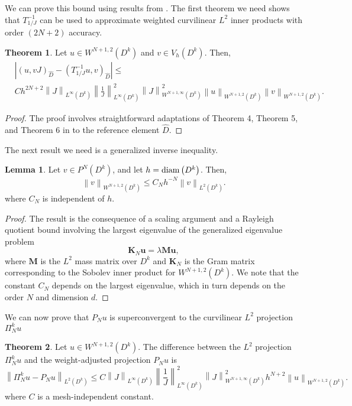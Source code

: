 \documentclass[preprint,10pt]{article}
\theoremstyle{definition}
\theoremstyle{lemma}
\newtheorem{lemma}{Lemma}
\theoremstyle{theorem}
\newtheorem{theorem}{Theorem}
\theoremstyle{assumption}
\renewcommand{\hat}{\widehat}
\newcommand{\nor}[1]{\left\| #1 \right\|}
\newcommand{\LRp}[1]{\left( #1 \right)}
\newcommand{\LRb}[1]{\left| #1 \right|}
\begin{document}
{We can prove this bound using results from \cite{chan2016weight1,chan2016weight2}.  The first theorem we need shows that $T_{1/J}^{-1}$ can be used to approximate weighted curvilinear $L^2$ inner products with order $(2N+2)$ accuracy.  
\begin{theorem}
\label{thm:moment}
Let $u\in W^{N+1,2}\LRp{D^k}$ and $v\in V_h\LRp{D^k}$.  Then, 
\begin{align*}
&\LRb{\LRp{u,vJ}_{\hat{D}} - \LRp{T^{-1}_{1/J}u,v}_{\hat{D}}} \leq \\
&Ch^{2N+2}\nor{J}_{L^{\infty}\LRp{D^k}}  \nor{\frac{1}{J}}_{L^{\infty}\LRp{D^k}}^2 \nor{J}^2_{W^{N+1,\infty}\LRp{D^k}}\nor{u}_{W^{N+1,2}\LRp{D^k}}\nor{v}_{W^{N+1,2}\LRp{D^k}}.
\end{align*}
\end{theorem}
\begin{proof}
The proof involves straightforward adaptations of Theorem 4, Theorem 5, and Theorem 6 in \cite{chan2016weight1} to the reference element $\hat{D}$.  
\end{proof}
The next result we need is a generalized inverse inequality.  
\begin{lemma}
\label{lemma:sobolev}
Let $v \in P^N\LRp{D^k}$, and let $h = {\rm diam}\LRp{D^k}$.  Then,
\[
\nor{v}_{W^{N+1,2}\LRp{D^k}} \leq C_{N} h^{-N} \nor{v}_{L^2\LRp{D^k}}.
\]
where $C_{N}$ is independent of $h$.
\end{lemma}
\begin{proof}
The result is the consequence of a scaling argument and a Rayleigh quotient bound involving the largest eigenvalue of the generalized eigenvalue problem  
\[
\bm{K}_N\bm{u} = \lambda\bm{M}\bm{u},
\]
where $\bm{M}$ is the $L^2$ mass matrix over $D^k$ and $\bm{K}_N$ is the Gram matrix corresponding to the Sobolev inner product for $W^{N+1,2}\LRp{D^k}$.  We note that the constant $C_N$ depends on the largest eigenvalue, which in turn depends on the order $N$ and dimension $d$.  
\end{proof}

We can now prove that $P_Nu$ is superconvergent to the curvilinear $L^2$ projection $\Pi_N^k u$
\begin{theorem}
Let $u \in W^{N+1,2}\LRp{D^k}$.  The difference between the $L^2$ projection $\Pi^k_Nu$ and the weight-adjusted projection $P_Nu$ is
\[
\nor{\Pi_N^k u - P_N u}_{L^2\LRp{D^k}} \leq C\nor{J}_{L^{\infty}\LRp{D^k}}  \nor{\frac{1}{J}}_{L^{\infty}\LRp{D^k}}^2 \nor{J}^2_{W^{N+1,\infty}\LRp{D^k}} h^{N+2}\nor{u}_{W^{N+1,2}\LRp{D^k}}.
\]
where $C$ is a mesh-independent constant.
\end{theorem}

}
\end{document}
